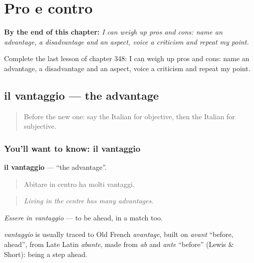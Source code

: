 
\chapter{Pro e contro}
\label{ch:it-pro-e-contro}

\begin{chapteropening}
\textbf{By the end of this chapter:} \emph{I can weigh up pros and cons: name an advantage, a disadvantage and an aspect, voice a criticism and repeat my point.}

Complete the last lesson of chapter 348: I can weigh up pros and cons: name an advantage, a disadvantage and an aspect, voice a criticism and repeat my point.
\end{chapteropening}

\section[il vantaggio]{il vantaggio — the advantage}

\label{lesson:IT-C348-vantaggio}



\begin{quote}
Before the new one: say the Italian for objective, then the Italian for subjective.
\end{quote}

\subsection*{You'll want to know: il vantaggio}
\textbf{il vantaggio} — \textquotedblleft{}the advantage\textquotedblright{}.

\begin{quote}
Abitare in centro ha molti vantaggi.
\end{quote}

\begin{quote}
\emph{Living in the centre has many advantages.}
\end{quote}

\emph{Essere in vantaggio} — to be ahead, in a match too.

\begin{cousinweb}
\emph{vantaggio} is usually traced to Old French \emph{avantage}, built on \emph{avant} \textquotedblleft{}before, ahead\textquotedblright{}, from Late Latin \emph{abante}, made from \emph{ab} and \emph{ante} \textquotedblleft{}before\textquotedblright{} (Lewis \& Short): being a step ahead.
\end{cousinweb}

